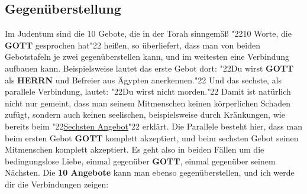 \documentclass[10pt,a5paper]{article}
\newcommand{\Gott}[0]{\textbf{GOTT}}
\newcommand{\Herrn}[0]{\textbf{HERRN}}
\newcommand{\q}[1]{\char"22{#1}\char"22 }
\begin{document}
	\subsection{Gegen\"uberstellung}
		Im Judentum sind die 10 Gebote,
		die in der Torah sinngem\"a{\ss} \q{10 Worte, die {\Gott} gesprochen hat} hei{\ss}en,
		so \"uberliefert,
		dass man von beiden Gebotstafeln je zwei gegen\"uberstellen kann,
		und im weitesten eine Verbindung aufbauen kann.
		Beispielsweise lautet das erste Gebot dort:
		\q{Du wirst {\Gott} als {\Herrn} und Befreier aus Ägypten anerkennen.}
		Und das sechste,
		als parallele Verbindung,
		lautet:
		\q{Du wirst nicht morden.}
		Damit ist nat\"urlich nicht nur gemeint,
		dass man seinem Mitmenschen keinen k\"orperlichen Schaden zuf\"ugt,
		sondern auch keinen seelischen,
		beispielsweise durch Kr\"ankungen,
		wie bereits beim \q{\hyperref[DasSechsteAngebot]{Sechsten Angebot}} erkl\"art.
		Die Parallele besteht hier,
		dass man beim ersten Gebot {\Gott} komplett akzeptiert,
		und beim sechsten Gebot seinen Mitmenschen komplett akzeptiert.
		Es geht also in beiden F\"allen um die bedingungslose Liebe,
		einmal gegen\"uber {\Gott},
		einmal gegen\"uber seinem N\"achsten.
		Die \textbf{10 Angebote} kann man ebenso gegen\"uberstellen,
		und ich werde dir die Verbindungen zeigen:
		\\
\end{document}
